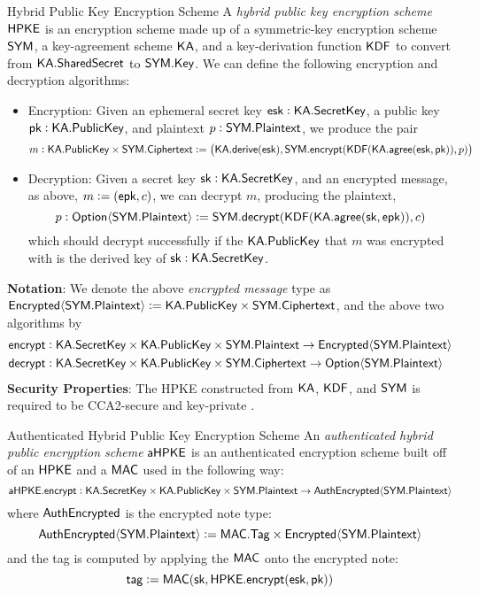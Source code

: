 \begin{definitiontoc}{Hybrid Public Key Encryption Scheme}
    A \emph{hybrid public key encryption scheme} \cite{irtf-cfrg-hpke-12} ${\textsf{HPKE}}$ is an encryption scheme made up of a symmetric-key encryption scheme ${\textsf{SYM}}$, a key-agreement scheme ${\textsf{KA}}$, and a key-derivation function ${\textsf{KDF}}$ to convert from ${\textsf{KA}}.{\textsf{SharedSecret}}$ to ${\textsf{SYM}}.{\textsf{Key}}$. We can define the following encryption and decryption algorithms:
    \begin{itemize}
        \item Encryption: Given an ephemeral secret key ${\textsf{esk}}: {\textsf{KA}}.{\textsf{SecretKey}}$, a public key ${\textsf{pk}}: {\textsf{KA}}.{\textsf{PublicKey}}$, and plaintext $p : {\textsf{SYM}}.{\textsf{Plaintext}}$, we produce the pair
            \[m : {\textsf{KA}}.{\textsf{PublicKey}} \times {\textsf{SYM}}.{\textsf{Ciphertext}} := \left({\textsf{KA}}.{\textsf{derive}}({\textsf{esk}}), {\textsf{SYM}}.{\textsf{encrypt}}({\textsf{KDF}}({\textsf{KA}}.{\textsf{agree}}({\textsf{esk}}, {\textsf{pk}})), p)\right)\]
        \item Decryption: Given a secret key ${\textsf{sk}} : {\textsf{KA}}.{\textsf{SecretKey}}$, and an encrypted message, as above, $m := ({\textsf{epk}}, c)$, we can decrypt $m$, producing the plaintext,
            \[p : {\textsf{Option}}\langle{{\textsf{SYM}}.{\textsf{Plaintext}}}\rangle := {\textsf{SYM}}.{\textsf{decrypt}}({\textsf{KDF}}({\textsf{KA}}.{\textsf{agree}}({\textsf{sk}}, {\textsf{epk}})), c)\]
            which should decrypt successfully if the ${\textsf{KA}}.{\textsf{PublicKey}}$ that $m$ was encrypted with is the derived key of ${\textsf{sk}} : {\textsf{KA}}.{\textsf{SecretKey}}$.
    \end{itemize}

    \textbf{Notation}: We denote the above \emph{encrypted message} type as ${\textsf{Encrypted}}\langle{{\textsf{SYM}}.{\textsf{Plaintext}}}\rangle := {\textsf{KA}}.{\textsf{PublicKey}} \times {\textsf{SYM}}.{\textsf{Ciphertext}}$, and the above two algorithms by
    \begin{align*}
        {\textsf{encrypt}} &: {\textsf{KA}}.{\textsf{SecretKey}} \times {\textsf{KA}}.{\textsf{PublicKey}} \times {\textsf{SYM}}.{\textsf{Plaintext}} \to {\textsf{Encrypted}}\langle{{\textsf{SYM}}.{\textsf{Plaintext}}}\rangle \\
        {\textsf{decrypt}} &: {\textsf{KA}}.{\textsf{SecretKey}} \times {\textsf{KA}}.{\textsf{PublicKey}} \times {\textsf{SYM}}.{\textsf{Ciphertext}} \to {\textsf{Option}}\langle{{\textsf{SYM}}.{\textsf{Plaintext}}}\rangle
    \end{align*}
    \textbf{Security Properties}: The HPKE constructed from ${\textsf{KA}}$, ${\textsf{KDF}}$, and ${\textsf{SYM}}$ is required to be CCA2-secure and key-private \cite{BBDP01AC}. \\
\end{definitiontoc}

\begin{definitiontoc}{Authenticated Hybrid Public Key Encryption Scheme}
    An \emph{authenticated hybrid public encryption scheme} ${\textsf{aHPKE}}$ is an authenticated encryption scheme built off of an ${\textsf{HPKE}}$ and a ${\textsf{MAC}}$ used in the following way:
    \[{\textsf{aHPKE}}.{\textsf{encrypt}} : {\textsf{KA}}.{\textsf{SecretKey}} \times {\textsf{KA}}.{\textsf{PublicKey}} \times {\textsf{SYM}}.{\textsf{Plaintext}} \to {\textsf{AuthEncrypted}}\langle{{\textsf{SYM}}.{\textsf{Plaintext}}}\rangle\]
    where ${\textsf{AuthEncrypted}}$ is the encrypted note type:
    \[{\textsf{AuthEncrypted}}\langle{{\textsf{SYM}}.{\textsf{Plaintext}}}\rangle := {\textsf{MAC}}.{\textsf{Tag}} \times {\textsf{Encrypted}}\langle{{\textsf{SYM}}.{\textsf{Plaintext}}}\rangle\]
    and the tag is computed by applying the ${\textsf{MAC}}$ onto the encrypted note:
    \[{\textsf{tag}} := {\textsf{MAC}}({\textsf{sk}}, {\textsf{HPKE}}.{\textsf{encrypt}}({\textsf{esk}}, {\textsf{pk}}))\]
\end{definitiontoc}

